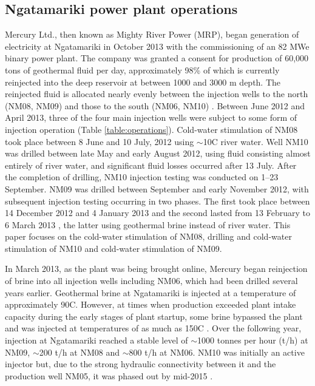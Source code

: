 \subsection{Ngatamariki power plant operations} \label{Plant_ops}
Mercury Ltd., then known as Mighty River Power (MRP), began generation of electricity at Ngatamariki in October 2013 with the commissioning of an 82 \acrshort{MWe} binary power plant. The company was granted a consent for production of 60,000 tons of geothermal fluid per day, approximately 98\% of which is currently reinjected into the deep reservoir at between 1000 and 3000 m depth. The reinjected fluid is allocated nearly evenly between the injection wells to the north (NM08, NM09) and those to the south (NM06, NM10) \citep{Clearwater_2015,buscarlet_2015}. Between June 2012 and April 2013, three of the four main injection wells were subject to some form of injection operation (Table \ref{table:operations}). Cold-water \gls{stimulation} of NM08 took place between 8 June and 10 July, 2012 using $\sim$10\textdegree{}C river water. Well NM10 was drilled between late May and early August 2012, using fluid consisting almost entirely of river water, and significant fluid losses occurred after 13 July. After the completion of drilling, NM10 injection testing was conducted on 1--23 September. NM09 was drilled between September and early November 2012, with subsequent injection testing occurring in two phases. The first took place between 14 December 2012 and 4 January 2013 and the second lasted from 13 February to 6 March 2013 \citep{Clearwater_2015}, the latter using geothermal brine instead of river water. This paper focuses on the cold-water \gls{stimulation} of NM08, drilling and cold-water \gls{stimulation} of NM10 and cold-water \gls{stimulation} of NM09.

In March 2013, as the plant was being brought online, Mercury began reinjection of brine into all injection wells including NM06, which had been drilled several years earlier. Geothermal brine at Ngatamariki is injected at a temperature of approximately 90\textdegree C. However, at times when production exceeded plant intake capacity during the early stages of plant startup, some brine bypassed the plant and was injected at temperatures of as much as 150\textdegree C \citep{Clearwater_2015}. Over the following year, injection at Ngatamariki reached a stable level of $\sim$1000 tonnes per hour (t/h) at NM09, $\sim$200 t/h at NM08 and $\sim$800 t/h at NM06. NM10 was initially an active injector but, due to the strong hydraulic connectivity between it and the production well NM05, it was phased out by mid-2015 \citep{buscarlet_2015}.


